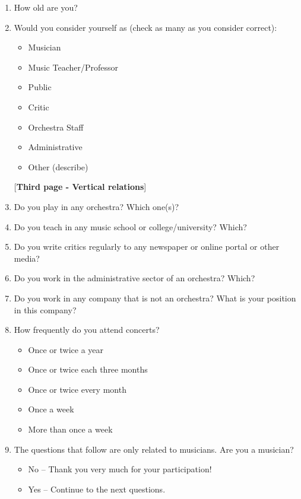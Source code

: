 \documentclass[a4paper, 12pt, openright, oneside, german, french, brazil, english]{abntex2}
\begin{document}
\begin{enumerate}
        \item How old are you?
          
        \item Would you consider yourself as (check as many as you consider correct):
          \begin{itemize}
          \item Musician
          \item Music Teacher/Professor
          \item Public
          \item Critic
          \item Orchestra Staff
          \item Administrative
          \item Other (describe)
          \end{itemize}


        [\textbf{Third page - Vertical relations}]  

        \item Do you play in any orchestra? Which one(s)?
        \item Do you teach in any music school or college/university? Which?
        \item Do you write critics regularly to any newspaper or online portal or other media?
        \item Do you work in the administrative sector of an orchestra? Which?
        \item Do you work in any company that is not an orchestra? What is your position in this company?

        \item How frequently do you attend concerts?
          \begin{itemize}
          \item Once or twice a year
          \item Once or twice each three months
          \item Once or twice every month
          \item Once a week
          \item More than once a week
          \end{itemize}

          
        \item The questions that follow are only related to musicians. Are you a musician?
          \begin{itemize}
          \item No -- Thank you very much for your participation!
          \item Yes -- Continue to the next questions.
          \end{itemize}



\end{enumerate}
\end{document}
